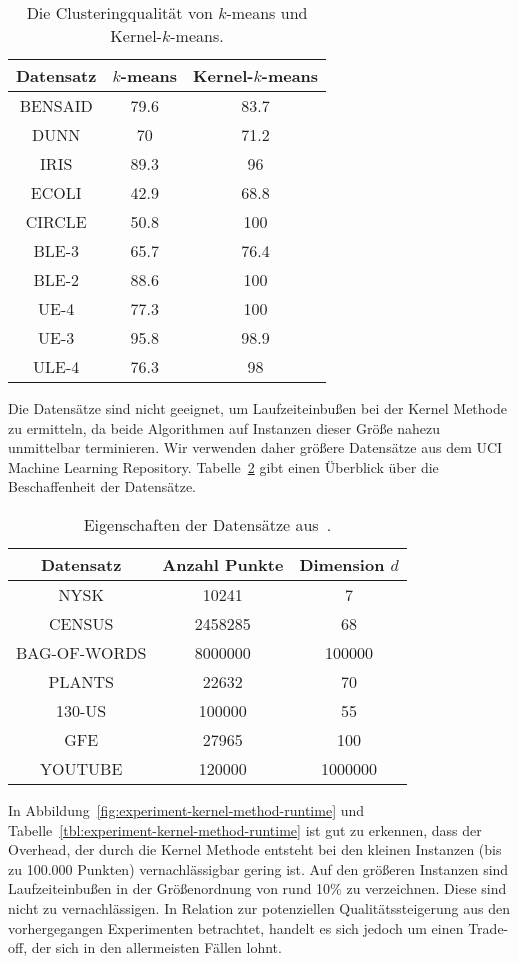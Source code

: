 \begin{table}[t]
\centering
\begin{tabular}{@{}ccc@{}} \toprule
	\textbf{Datensatz} & \textbf{$k$-means} & \textbf{Kernel-$k$-means} \\ \midrule
	BENSAID & 79.6 & 83.7 \\
	DUNN & 70 & 71.2 \\
	IRIS & 89.3 & 96 \\
	ECOLI & 42.9 & 68.8 \\
	CIRCLE & 50.8 & 100 \\
	BLE-3 & 65.7 & 76.4 \\
	BLE-2 & 88.6 & 100 \\
	UE-4 & 77.3 & 100 \\
	UE-3 & 95.8 & 98.9 \\
	ULE-4 & 76.3 & 98 \\ \bottomrule
\end{tabular}
\caption{Die Clusteringqualität von $k$-means und Kernel-$k$-means.}
\label{tbl:experiment-kernel-method-quality}
\end{table}
\absatz
Die Datensätze sind nicht geeignet, um Laufzeiteinbußen bei der Kernel Methode zu ermitteln, da beide Algorithmen auf Instanzen
dieser Größe nahezu unmittelbar terminieren. Wir verwenden daher größere Datensätze aus dem UCI Machine Learning Repository.
Tabelle~\ref{tbl:experiment-kernel-method-runtime-datasets} gibt einen Überblick über die Beschaffenheit der Datensätze.

\begin{table}[h]
\centering
\begin{tabular}{@{}ccc@{}} \toprule
	\textbf{Datensatz} & \textbf{Anzahl Punkte} & \textbf{Dimension} $d$ \\ \midrule
	NYSK & 10241 & 7 \\
	CENSUS & 2458285  & 68 \\
	BAG-OF-WORDS & 8000000 & 100000 \\
	PLANTS & 22632 & 70 \\
	130-US & 100000 & 55 \\
	GFE & 27965 & 100 \\
	YOUTUBE & 120000 & 1000000 \\ \bottomrule
\end{tabular}
\caption{Eigenschaften der Datensätze aus~\cite{Lichman13}.}
\label{tbl:experiment-kernel-method-runtime-datasets}
\end{table}
In Abbildung~\ref{fig:experiment-kernel-method-runtime} und Tabelle~\ref{tbl:experiment-kernel-method-runtime} ist gut zu
erkennen, dass der Overhead, der durch die Kernel Methode entsteht bei den kleinen Instanzen (bis zu 100.000 Punkten)
vernachlässigbar gering ist. Auf den größeren Instanzen sind Laufzeiteinbußen in der Größenordnung von rund 10\% zu verzeichnen.
Diese sind nicht zu vernachlässigen. In Relation zur potenziellen Qualitätssteigerung aus den vorhergegangen Experimenten
betrachtet, handelt es sich jedoch um einen Trade-off, der sich in den allermeisten Fällen lohnt.

